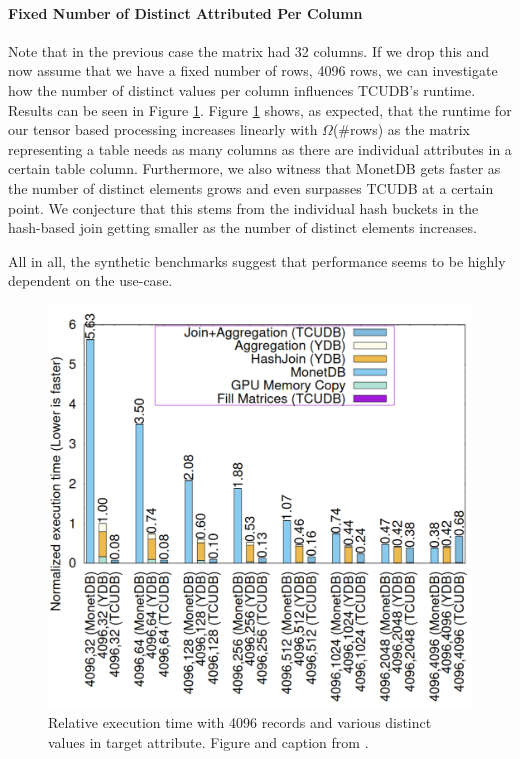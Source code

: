 \documentclass{paper}
\begin{document}
	\paragraph{Fixed Number of Distinct Attributed Per Column}
	Note that in the previous case the matrix had 32 columns. If we drop this and now assume that we have a fixed number of rows, 4096 rows, we can investigate how the number of distinct values per column influences TCUDB's runtime. Results can be seen in Figure \ref{fig:bench2}. Figure \ref{fig:bench2} shows, as expected, that the runtime for our tensor based processing increases linearly with $\Omega$(\#rows) as the matrix representing a table needs as many columns as there are individual attributes in a certain table column. Furthermore, we also witness that MonetDB gets faster as the number of distinct elements grows and even surpasses TCUDB at a certain point. We conjecture that this stems from the individual hash buckets in the hash-based join getting smaller as the number of distinct elements increases.
	
	All in all, the synthetic benchmarks suggest that performance seems to be highly dependent on the use-case.
	
	\begin{figure}
		\centering
		\includegraphics[width=0.9\linewidth]{bench2}
		\caption{Relative execution time with 4096 records and various distinct values in target attribute. Figure and caption from \cite{hu2021tcudb}.}
		\label{fig:bench2}
	\end{figure}
	
\end{document}
